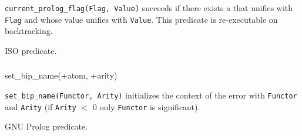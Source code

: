 \Description

\texttt{current\_prolog\_flag(Flag, Value)}
succeeds if there exists a  that unifies with
\texttt{Flag} and whose value unifies with \texttt{Value}. This predicate
is re-executable on backtracking.

\begin{PlErrors}



\end{PlErrors}

\Portability

ISO predicate.

\subsubsection{\label{set-bip-name/2}}

\begin{TemplatesOneCol}
set\_bip\_name(+atom, +arity)

\end{TemplatesOneCol}

\Description

\texttt{set\_bip\_name(Functor, Arity)} initializes the context of the error
 with \texttt{Functor} and
\texttt{Arity} (if \texttt{Arity} $<$ 0 only \texttt{Functor} is
significant).

\begin{PlErrors}





\end{PlErrors}

\Portability

GNU Prolog predicate.

\subsubsection{\label{current-bip-name/2}}

